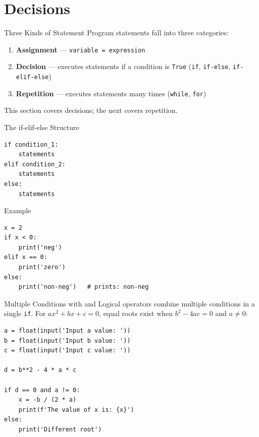 \documentclass[9pt,aspectratio=169,xcolor=table]{beamer}
\begin{document}
\section{Decisions}

\begin{frame}{Three Kinds of Statement}
    \leavevmode
    Program statements fall into three categories:

    \vspace{2mm}
    \begin{enumerate}
        \item \textbf{Assignment} --- \texttt{variable = expression}
        \item \textbf{Decision} --- executes statements if a condition
              is \texttt{True} (\texttt{if}, \texttt{if-else},
              \texttt{if-elif-else})
        \item \textbf{Repetition} --- executes statements many times
              (\texttt{while}, \texttt{for})
    \end{enumerate}

    \vspace{3mm}
    {\small This section covers decisions; the next covers repetition.}
\end{frame}

\begin{frame}[fragile]{The if-elif-else Structure}
    \leavevmode
\begin{lstlisting}
if condition_1:
    statements
elif condition_2:
    statements
else:
    statements
\end{lstlisting}

    \vspace{2mm}
    \begin{block}{Example}
\begin{lstlisting}
x = 2
if x < 0:
    print('neg')
elif x == 0:
    print('zero')
else:
    print('non-neg')   # prints: non-neg
\end{lstlisting}
    \end{block}
\end{frame}

\begin{frame}[fragile]{Multiple Conditions with and}
    \leavevmode
    Logical operators combine multiple conditions in a single
    \texttt{if}. For $ax^2+bx+c=0$, equal roots exist when
    $b^2-4ac=0$ \alert{and} $a \neq 0$:

\begin{lstlisting}
a = float(input('Input a value: '))
b = float(input('Input b value: '))
c = float(input('Input c value: '))

d = b**2 - 4 * a * c

if d == 0 and a != 0:
    x = -b / (2 * a)
    print(f'The value of x is: {x}')
else:
    print('Different root')
\end{lstlisting}
\end{frame}
\end{document}
